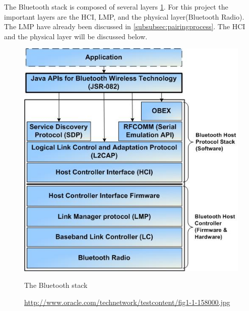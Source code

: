 The Bluetooth stack is composed of several layers \ref{fig:bt_stack}. For this project the important layers are the HCI, LMP, and the physical layer(Bluetooth Radio). The LMP have already been discussed in \ref{subsubsec:pairingprocess}. The HCI and the physical layer will be discussed below.

\begin{figure}[h]
  \includegraphics[scale=0.8]{images/bluetoothstack.jpg}
  \caption{The Bluetooth stack}
  \label{fig:bt_stack}
  \caption*{\url{http://www.oracle.com/technetwork/testcontent/fig1-1-158000.jpg}}
\end{figure}
\newpage
